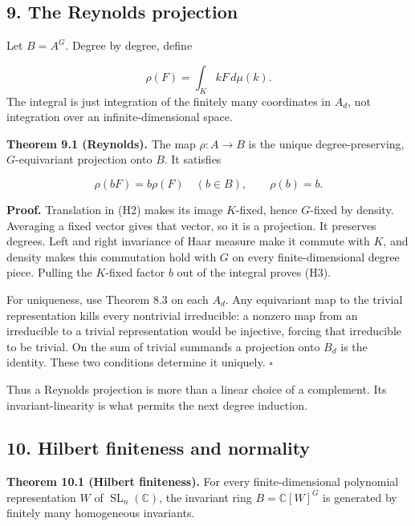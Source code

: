 \documentclass[
]{article}
\begin{document}
\subsection{9. The Reynolds projection}\label{section-9}

Let \(B=A^G\). Degree by degree, define
\protect{}\label{equation-H2}{}

\[
\rho(F)=\int_K kF\,d\mu(k).
\tag{H2}
\] The integral is just integration of the finitely many coordinates in
\(A_d\), not integration over an infinite-dimensional space.

\protect{}\label{theorem-9-1}{}

\textbf{Theorem 9.1 (Reynolds).} The map \(\rho:A\to B\) is the unique
degree-preserving, \(G\)-equivariant projection onto \(B\). It satisfies
\protect{}\label{equation-H3}{}

\[
\rho(bF)=b\rho(F)\quad(b\in B),\qquad
\rho(b)=b.
\tag{H3}
\]

\textbf{Proof.} Translation in (H2) makes its image \(K\)-fixed, hence
\(G\)-fixed by density. Averaging a fixed vector gives that vector, so
it is a projection. It preserves degrees. Left and right invariance of
Haar measure make it commute with \(K\), and density makes this
commutation hold with \(G\) on every finite-dimensional degree piece.
Pulling the \(K\)-fixed factor \(b\) out of the integral proves (H3).

For uniqueness, use Theorem 8.3 on each \(A_d\). Any equivariant map to
the trivial representation kills every nontrivial irreducible: a nonzero
map from an irreducible to a trivial representation would be injective,
forcing that irreducible to be trivial. On the sum of trivial summands a
projection onto \(B_d\) is the identity. These two conditions determine
it uniquely. \(\square\)

Thus a Reynolds projection is more than a linear choice of a complement.
Its invariant-linearity is what permits the next degree induction.

\subsection{10. Hilbert finiteness and normality}\label{section-10}

\protect{}\label{theorem-10-1}{}

\textbf{Theorem 10.1 (Hilbert finiteness).} For every finite-dimensional
polynomial representation \(W\) of \(\operatorname{SL}_n(\mathbb C)\),
the invariant ring \(B=\mathbb C [W]^G\) is generated by finitely many
homogeneous invariants.
\end{document}
